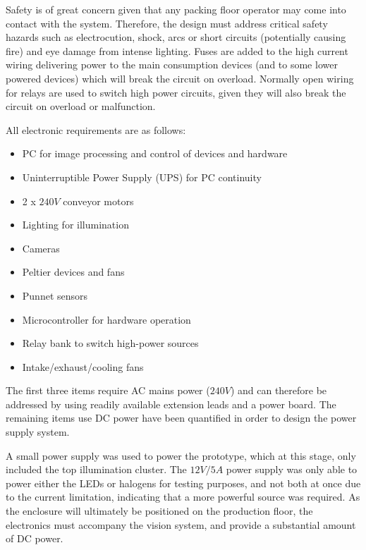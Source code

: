 \documentclass[fleqn,twoside,12pt]{report}
\begin{document}
Safety is of great concern given that any packing floor operator may come into contact with the system. Therefore, the design must address critical safety hazards such as electrocution, shock, arcs or short circuits (potentially causing fire) and eye damage from intense lighting. Fuses are added to the high current wiring delivering power to the main consumption devices (and to some lower powered devices) which will break the circuit on overload. Normally open wiring for relays are used to switch high power circuits, given they will also break the circuit on overload or malfunction.  


All electronic requirements are as follows:

\begin{itemize}
	\item PC for image processing and control of devices and hardware
	\item Uninterruptible Power Supply (UPS) for PC continuity
	\item 2 x $240V$ conveyor motors
	\item Lighting for illumination
	\item Cameras
	\item Peltier devices and fans 
	\item Punnet sensors
	\item Microcontroller for hardware operation
	\item Relay bank to switch high-power sources
	\item Intake/exhaust/cooling fans
\end{itemize} 

The first three items require AC mains power ($240V$) and can therefore be addressed by using readily available extension leads and a power board. The remaining items use DC power have been quantified in order to design the power supply system.

A small power supply was used to power the prototype, which at this stage, only included the top illumination cluster. The $12V/5A$ power supply was only able to power either the LEDs or halogens for testing purposes, and not both at once due to the current limitation, indicating that a more powerful source was required. As the enclosure will ultimately be positioned on the production floor, the electronics must accompany the vision system, and provide a substantial amount of DC power. 
\end{document}
